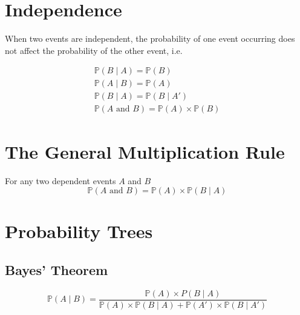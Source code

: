 \documentclass[12pt letter]{report}
\begin{document}

\section{Independence}

When two events are independent, the probability of one event occurring does not affect the probability of the other
event, i.e.

\begin{align*}
  \mathbb{P} \left( B  \mid  A \right) = \mathbb{P} \left( B \right)           \\
  \mathbb{P} \left( A  \mid B \right)  = \mathbb{P} \left( A \right)           \\
  \mathbb{P} \left( B  \mid A \right)  = \mathbb{P} \left( B  \mid A'  \right) \\
  \mathbb{P} \left( A \text{ and } B \right) = \mathbb{P} \left( A \right)  \times \mathbb{P} \left( B \right)
\end{align*}

\section{The General Multiplication Rule}

For any two dependent events $A$ and $B$
\[
  \mathbb{P} \left( A \text{ and } B \right) = \mathbb{P} \left( A \right) \times \mathbb{P} \left( B  \mid A \right)
\]

\section{Probability Trees}


\subsection{Bayes' Theorem}

\[
  \mathbb{P} \left( A  \mid B \right)  = \frac{\mathbb{P} \left( A \right) \times P \left( B  \mid A \right)   }{
    \mathbb{P} \left( A \right) \times \mathbb{P} \left( B  \mid A \right) + \mathbb{P} \left( A' \right) \times \mathbb{P}
    \left( B  \mid A' \right) }
\]
\end{document}

